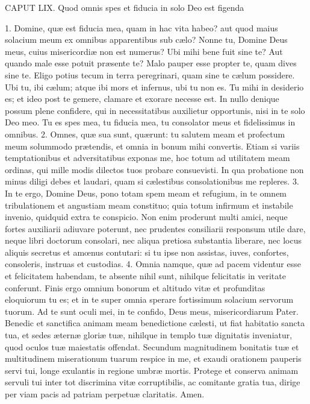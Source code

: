 CAPUT LIX.
Quod omnis spes et fiducia in solo Deo est figenda

1. Domine, quæ est fiducia mea, quam in hac vita habeo? aut quod maius solacium meum ex omnibus apparentibus sub cælo? Nonne tu, Domine Deus meus, cuius misericordiæ non est numerus? Ubi mihi bene fuit sine te? Aut quando male esse potuit præsente te? Malo pauper esse propter te, quam dives sine te. Eligo potius tecum in terra peregrinari, quam sine te cælum possidere. Ubi tu, ibi cælum; atque ibi mors et infernus, ubi tu non es. Tu mihi in desiderio es; et ideo post te gemere, clamare et exorare necesse est. In nullo denique possum plene confidere, qui in necessitatibus auxilietur opportunis, nisi in te solo Deo meo. Tu es spes mea, tu fiducia mea, tu consolator meus et fidelissimus in omnibus.
2. Omnes, quæ sua sunt, quærunt: tu salutem meam et profectum meum solummodo prætendis, et omnia in bonum mihi convertis. Etiam si variis temptationibus et adversitatibus exponas me, hoc totum ad utilitatem meam ordinas, qui mille modis dilectos tuos probare consuevisti. In qua probatione non minus diligi debes et laudari, quam si cælestibus consolationibus me repleres.
3. In te ergo, Domine Deus, pono totam spem meam et refugium, in te omnem tribulationem et angustiam meam constituo; quia totum infirmum et instabile invenio, quidquid extra te conspicio. Non enim proderunt multi amici, neque fortes auxiliarii adiuvare poterunt, nec prudentes consiliarii responsum utile dare, neque libri doctorum consolari, nec aliqua pretiosa substantia liberare, nec locus aliquis secretus et amœnus contutari: si tu ipse non assistas, iuves, confortes, consoleris, instruas et custodias.
4. Omnia namque, quæ ad pacem videntur esse et felicitatem habendam, te absente nihil sunt, nihilque felicitatis in veritate conferunt. Finis ergo omnium bonorum et altitudo vitæ et profunditas eloquiorum tu es; et in te super omnia sperare fortissimum solacium servorum tuorum. Ad te sunt oculi mei, in te confido, Deus meus, misericordiarum Pater. Benedic et sanctifica animam meam benedictione cælesti, ut fiat habitatio sancta tua, et sedes æternæ gloriæ tuæ, nihilque in templo tuæ dignitatis inveniatur, quod oculos tuæ maiestatis offendat. Secundum magnitudinem bonitatis tuæ et multitudinem miserationum tuarum respice in me, et exaudi orationem pauperis servi tui, longe exulantis in regione umbræ mortis. Protege et conserva animam servuli tui inter tot discrimina vitæ corruptibilis, ac comitante gratia tua, dirige per viam pacis ad patriam perpetuæ claritatis. Amen.




